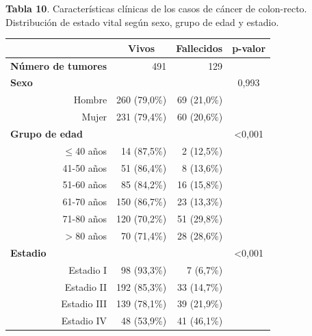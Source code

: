 \textbf{Tabla 10}. Características clínicas de los casos de cáncer de colon-recto. Distribución de  estado vital según sexo, grupo de edad y estadio.

\begin{table}[H]
		\centering
	\begin{tabular}{rrrc}
		\cline{2-4}
		\multicolumn{1}{l}{}                           & \multicolumn{1}{c}{\textbf{Vivos}} & \multicolumn{1}{c}{\textbf{Fallecidos}} & \multicolumn{1}{c}{\textbf{p-valor}} \\ \hline
		\multicolumn{1}{l}{\textbf{Número de tumores}} & 491            & 129                 &                  \\ \hline
		\multicolumn{1}{l}{\textbf{Sexo}}              &                &                     & 0,993            \\
		Hombre                                         & 260 (79,0\%)     & 69 (21,0\%)           &                  \\
		Mujer                                          & 231 (79,4\%)   & 60 (20,6\%)         &                  \\ \hline
		\multicolumn{1}{l}{\textbf{Grupo de edad}}     &                &                     & \textless{}0,001 \\
		$\leq$40 años                                     & 14 (87,5\%)    & 2 (12,5\%)          &                  \\
		41-50 años                                     & 51 (86,4\%)    & 8 (13,6\%)          &                  \\
		51-60 años                                     & 85 (84,2\%)    & 16 (15,8\%)         &                  \\
		61-70 años                                     & 150 (86,7\%)   & 23 (13,3\%)         &                  \\
		71-80 años                                     & 120 (70,2\%)   & 51 (29,8\%)         &                  \\
		$>$80 años                                  & 70 (71,4\%)    & 28 (28,6\%)         &                  \\ \hline
		\multicolumn{1}{l}{\textbf{Estadio}}           &                &                     & \textless{}0,001 \\
		Estadio I                                      & 98 (93,3\%)    & 7 (6,7\%)           &                  \\
		Estadio II                                     & 192 (85,3\%)   & 33 (14,7\%)         &                  \\
		Estadio III                                    & 139 (78,1\%)   & 39 (21,9\%)         &                  \\
		Estadio IV                                     & 48 (53,9\%)    & 41 (46,1\%)         &                  \\ \hline
	\end{tabular}
\end{table}

